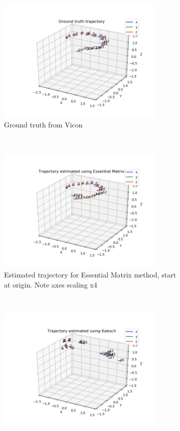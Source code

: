 \documentclass[12pt,a4paper]{article}
\begin{document}
\begin{figure}[p]
\begin{subfigure}[t]{0.5\textwidth}
  \centering
    \includegraphics[width=80mm]{../quad/basic-reg-saves/rtrj_gt_40.png}
  \caption{Ground truth from Vicon}
  \end{subfigure}%
  ~
  \begin{subfigure}[t]{0.5\textwidth}
  \centering
    \includegraphics[width=80mm]{../quad/basic-reg-saves/rtrj_rgb_40.png}
  \caption{Estimated trajectory for Essential Matrix method, start at origin. Note axes scaling x4}
  \end{subfigure}
  \\
  \begin{subfigure}[t]{0.5\textwidth}
  \centering
    \includegraphics[width=80mm]{../quad/basic-reg-saves/rtrj_d_40.png}

\end{subfigure}
\end{figure}
\end{document}
